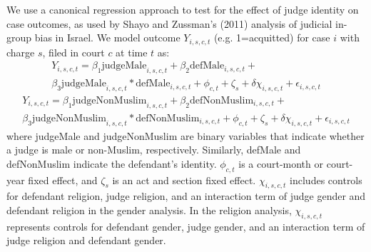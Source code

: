 \documentclass[12pt,english]{article}
\begin{document}
We use a canonical regression approach to test for the effect of judge identity on case outcomes, as used by Shayo and Zussman's (2011) analysis of judicial in-group bias in Israel.  We model outcome $Y_{i,s,c,t}$ (e.g. 1=acquitted) for case $i$ with charge $s$, filed in court $c$ at time $t$ as:
\begin{equation}
  \label{eq:female}
  \begin{split}
    Y_{i,s,c,t} = \beta_{1} \text{judgeMale}_{i,s,c,t} + \beta_{2} \text{defMale}_{i,s,c,t} + \\
    \beta_{3} \text{judgeMale}_{i,s,c,t} * \text{defMale}_{i,s,c,t} + \phi_{c,t} + \zeta_{s} + \delta \chi_{i,s,c,t} + \epsilon_{i,s,c,t}
  \end{split}
\end{equation}
\begin{equation} \label{eq:Muslim}
  \begin{split}
    Y_{i,s,c,t} = \beta_{1} \text{judgeNonMuslim}_{i,s,c,t} + \beta_{2} \text{defNonMuslim}_{i,s,c,t} + \\
    \beta_{3} \text{judgeNonMuslim}_{i,s,c,t} * \text{defNonMuslim}_{i,s,c,t} + \phi_{c,t} + \zeta_{s} + \delta \chi_{i,s,c,t} + \epsilon_{i,s,c,t}
  \end{split}
\end{equation}
where judgeMale and judgeNonMuslim are binary variables that indicate whether a judge is male or non-Muslim, respectively. Similarly, defMale and defNonMuslim indicate the defendant's identity. $\phi_{c,t}$ is a court-month or court-year fixed effect, and $\zeta_{s}$ is an act and section fixed effect. $\chi_{i,s,c,t}$ includes controls for defendant religion, judge religion, and an interaction term of judge gender and defendant religion in the gender analysis. In the religion analysis,  $\chi_{i,s,c,t}$ represents controls for defendant gender, judge gender, and an interaction term of judge religion and defendant gender.
\end{document}
